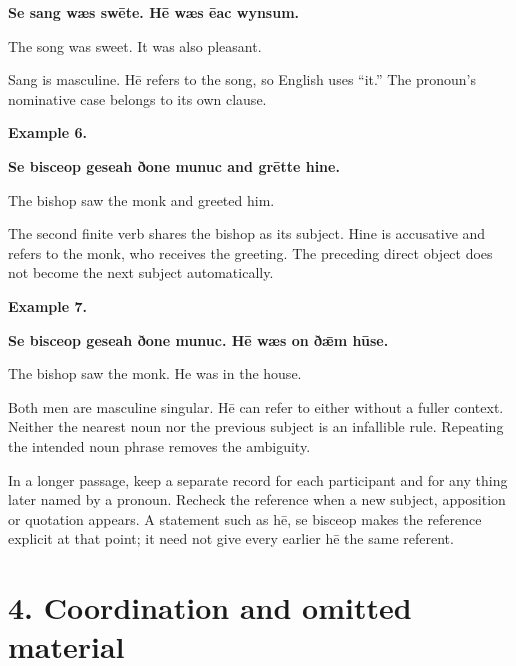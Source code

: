 \textbf{Se sang wæs swēte. Hē wæs ēac wynsum.}

The song was sweet. It was also pleasant.

Sang is masculine. Hē refers to the song, so English uses “it.” The pronoun’s nominative case belongs to its own clause.

\textbf{Example 6.}

\textbf{Se bisceop geseah ðone munuc and grētte hine.}

The bishop saw the monk and greeted him.

The second finite verb shares the bishop as its subject. Hine is accusative and refers to the monk, who receives the greeting. The preceding direct object does not become the next subject automatically.

\textbf{Example 7.}

\textbf{Se bisceop geseah ðone munuc. Hē wæs on ðǣm hūse.}

The bishop saw the monk. He was in the house.

Both men are masculine singular. Hē can refer to either without a fuller context. Neither the nearest noun nor the previous subject is an infallible rule. Repeating the intended noun phrase removes the ambiguity.

In a longer passage, keep a separate record for each participant and for any thing later named by a pronoun. Recheck the reference when a new subject, apposition or quotation appears. A statement such as hē, se bisceop makes the reference explicit at that point; it need not give every earlier hē the same referent.

\section*{4. Coordination and omitted material}

